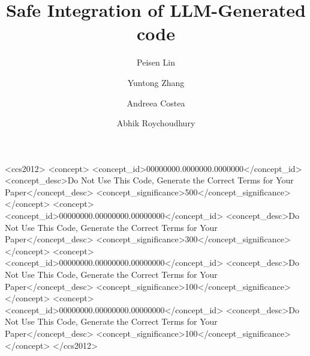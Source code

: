\documentclass[acmsmall,nonacm,review,anonymous]{acmart}
\begin{document}
\title{Safe Integration of LLM-Generated code}
\author{Peisen Lin}
\author{Yuntong Zhang}
\author{Andreea Costea}
\author{Abhik Roychoudhury}

\renewcommand{\shortauthors}{XXX}

\begin{abstract}

\end{abstract}


\begin{CCSXML}
<ccs2012>
 <concept>
  <concept_id>00000000.0000000.0000000</concept_id>
  <concept_desc>Do Not Use This Code, Generate the Correct Terms for Your Paper</concept_desc>
  <concept_significance>500</concept_significance>
 </concept>
 <concept>
  <concept_id>00000000.00000000.00000000</concept_id>
  <concept_desc>Do Not Use This Code, Generate the Correct Terms for Your Paper</concept_desc>
  <concept_significance>300</concept_significance>
 </concept>
 <concept>
  <concept_id>00000000.00000000.00000000</concept_id>
  <concept_desc>Do Not Use This Code, Generate the Correct Terms for Your Paper</concept_desc>
  <concept_significance>100</concept_significance>
 </concept>
 <concept>
  <concept_id>00000000.00000000.00000000</concept_id>
  <concept_desc>Do Not Use This Code, Generate the Correct Terms for Your Paper</concept_desc>
  <concept_significance>100</concept_significance>
 </concept>
</ccs2012>
\end{CCSXML}




\maketitle
\end{document}
